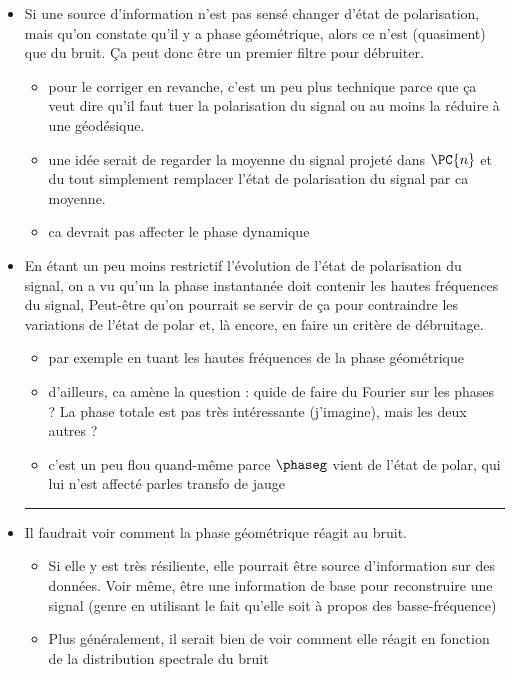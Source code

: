 \begin{itemize}
	\item Si une source d'information n'est pas sensé changer d'état de polarisation, mais qu'on constate qu'il y a phase géométrique, alors ce n'est (quasiment) que du bruit. Ça peut donc être un premier filtre pour débruiter.
	\begin{itemize}
		
		\item pour le corriger en revanche, c'est un peu plus technique parce que ça veut dire qu'il faut tuer la polarisation du signal ou au moins la réduire à une géodésique.
		
		\item une idée serait de regarder la moyenne du signal projeté dans $\PC{n}$ et du tout simplement remplacer l'état de polarisation du signal par ca moyenne. 
		
		\item ca devrait pas affecter le phase dynamique	
	\end{itemize}
	
	\item En étant un peu moins restrictif l'évolution de l'état de polarisation du signal, on a vu qu'un la phase instantanée doit contenir les hautes fréquences du signal, Peut-être qu'on pourrait se servir de ça pour contraindre les variations de l'état de polar et, là encore, en faire un critère de débruitage.
	\begin{itemize}
		
		\item  par exemple en tuant les hautes fréquences de la phase géométrique
		
		\item d'ailleurs, ca amène la question : quide de faire du Fourier sur les phases ? La phase totale est pas très intéressante (j'imagine), mais les deux autres ? 
		
		\item c'est un peu flou quand-même parce $\phaseg$ vient de l'état de polar, qui lui n'est affecté parles transfo de jauge
	\end{itemize}
	
	\hrule
	
	\item Il faudrait voir comment la phase géométrique réagit au bruit.
	\begin{itemize}
		
		\item Si elle y est très résiliente, elle pourrait être source d'information sur des données. Voir même, être une information de base pour reconstruire une signal (genre en utilisant le fait qu'elle soit à propos des basse-fréquence)
		
		\item Plus généralement, il serait bien de voir comment elle réagit en fonction de la distribution spectrale du bruit
	\end{itemize}
	
\end{itemize}



